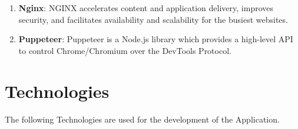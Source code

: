 \begin{enumerate}[label=\roman*.]
  \item \textbf{Nginx}: NGINX accelerates content and application delivery, improves security, and facilitates availability and scalability for the busiest websites. \cite{Nginx}

  \item \textbf{Puppeteer}: Puppeteer is a Node.js library which provides a high-level API to control Chrome/Chromium over the DevTools Protocol. \cite{Puppeteer}
  
\end{enumerate}


\section{Technologies}
\justify

The following Technologies are used for the development of the Application.

